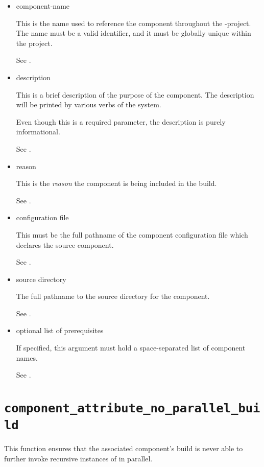 \begin{itemize}
\item{component-name}

  This is the name used to reference the component throughout the
  \lmsbw-project.  The name must be a valid \make identifier, and it
  must be globally unique within the project.

  See .

\item{description}

  This is a brief description of the purpose of the component.  The
  description will be printed by various verbs of the \lmsbw system.

  Even though this is a required parameter, the description is purely
  informational.

  See .

\item{reason}

  This is the \emph{reason} the component is being included in the
  build.

  See .

\item{configuration file}

  This must be the full pathname of the component configuration file
  which declares the source component.

  See .

\item{source directory}

  The full pathname to the source directory for the component.

  See .

\item{optional list of prerequisites}

  If specified, this argument must hold a space-separated list of
  component names.

  See .

\end{itemize}

\section{\texttt{component\_attribute\_no\_parallel\_build}}\label{api:component-attribute-no-parallel-build}

This function ensures that the associated component's build is never
able to further invoke recursive instances of \make in parallel.

